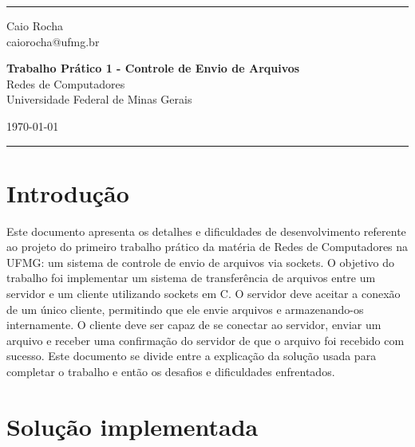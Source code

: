\documentclass[a4paper]{article}
\begin{document}

\fancyhead[C]{}
\hrule \medskip %
\begin{minipage}{0.295\textwidth} 
\raggedright
\footnotesize
Caio Rocha\hfill\\   
caiorocha@ufmg.br
\end{minipage}
\begin{minipage}{0.4\textwidth} 
\centering 
\large 
\textbf{Trabalho Prático 1 - Controle de Envio de Arquivos}
\\ 
\normalsize 
Redes de Computadores\\
Universidade Federal de Minas Gerais
\end{minipage}
\begin{minipage}{0.295\textwidth} 
\raggedleft
\today\hfill\\
\end{minipage}
\medskip\hrule 
\bigskip
\newcommand{\bigO}{\mathcal{O}}
\newcommand{\source}[1]{\caption*{Source: {#1}} }

\section{Introdução}
Este documento apresenta os detalhes e dificuldades de desenvolvimento referente ao projeto do primeiro trabalho prático da matéria de Redes de Computadores na UFMG: um sistema de controle de envio de arquivos via sockets. O objetivo do trabalho foi implementar um sistema de transferência de arquivos entre um servidor e um cliente utilizando sockets em C. O servidor deve aceitar a conexão de um único cliente, permitindo que ele envie arquivos e armazenando-os internamente. O cliente deve ser capaz de se conectar ao servidor, enviar um arquivo e receber uma confirmação do servidor de que o arquivo foi recebido com sucesso. Este documento se divide entre a explicação da solução usada para completar o trabalho e então os desafios e dificuldades enfrentados.

\section{Solução implementada}
\end{document}
